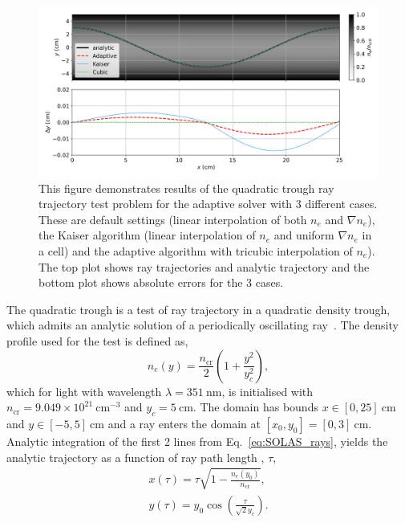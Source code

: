 \begin{figure}[t!]
    \includegraphics[width=\linewidth]{Numerics/Images/Quadtrough.png}
    \centering
    \caption{This figure demonstrates results of the quadratic trough ray trajectory test problem for the adaptive solver with 3 different cases.
    These are default settings (linear interpolation of both $n_e$ and $\nabla n_e$), the Kaiser algorithm (linear interpolation of $n_e$ and uniform $\nabla n_e$ in a cell) and the adaptive algorithm with tricubic interpolation of $n_e$).
    The top plot shows ray trajectories and analytic trajectory and the bottom plot shows absolute errors for the 3 cases.}%
    \label{fig:SOLAS_quadtrough}
\end{figure}

The quadratic trough is a test of ray trajectory in a quadratic density trough, which admits an analytic solution of a periodically oscillating ray~\cite{kaiser_laser_2000,haines_coupling_2020}.
The density profile used for the test is defined as,
\begin{equation}
    n_e(y) = \frac{n_{\text{cr}}}{2} \left( 1 + \frac{y^2}{y_c^2} \right),
\end{equation}
which for light with wavelength $\lambda=351\ \text{nm}$, is initialised with $n_{\text{cr}} = 9.049\times 10^{21} \ \text{cm}^{-3}$ and $y_c = 5 \ \text{cm}$.
The domain has bounds $x \in [0,25]\ \text{cm}$ and $y \in [-5,5]\ \text{cm}$ and a ray enters the domain at $[x_0,y_0]=[0,3]\ \text{cm}$.
Analytic integration of the first 2 lines from Eq.~\ref{eq:SOLAS_rays}, yields the analytic trajectory as a function of ray path length , $\tau$,
\begin{equation}
    \begin{gathered}
        x(\tau) = \tau\sqrt{1-\frac{n_e(y_0)}{n_{\text{cr}}}}, \\
        y(\tau) = y_0\cos{\left( \frac{\tau}{\sqrt{2}y_c} \right)}.
    \end{gathered}
\end{equation}

